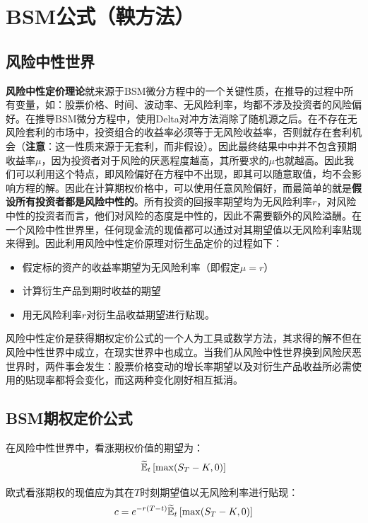 \documentclass[11pt]{article}
\begin{document}
\section{BSM公式（鞅方法）}

\subsection{风险中性世界}

\textbf{风险中性定价理论}就来源于BSM微分方程中的一个关键性质，在推导的过程中所有变量，如：股票价格、时间、波动率、无风险利率，均都不涉及投资者的风险偏好。在推导BSM微分方程中，使用Delta对冲方法消除了随机源之后。在不存在无风险套利的市场中，投资组合的收益率必须等于无风险收益率，否则就存在套利机会（\textbf{注意}：这一性质来源于无套利，而非假设）。因此最终结果中中并不包含预期收益率$\mu$，因为投资者对于风险的厌恶程度越高，其所要求的$\mu$也就越高。因此我们可以利用这个特点，即风险偏好在方程中不出现，即其可以随意取值，均不会影响方程的解。因此在计算期权价格中，可以使用任意风险偏好，而最简单的就是\textbf{假设所有投资者都是风险中性的}。所有投资的回报率期望均为无风险利率$r$，对风险中性的投资者而言，他们对风险的态度是中性的，因此不需要额外的风险溢酬。在一个风险中性世界里，任何现金流的现值都可以通过对其期望值以无风险利率贴现来得到。因此利用风险中性定价原理对衍生品定价的过程如下：
\begin{itemize}
    \item 假定标的资产的收益率期望为无风险利率（即假定$\mu=r$）
    \item 计算衍生产品到期时收益的期望
    \item 用无风险利率$r$对衍生品收益期望进行贴现。
\end{itemize}

风险中性定价是获得期权定价公式的一个人为工具或数学方法，其求得的解不但在风险中性世界中成立，在现实世界中也成立。当我们从风险中性世界换到风险厌恶世界时，两件事会发生：股票价格变动的增长率期望以及对衍生产品收益所必需使用的贴现率都将会变化，而这两种变化刚好相互抵消。

\subsection{BSM期权定价公式}

在风险中性世界中，看涨期权价值的期望为：
\begin{equation*}
    \widetilde{\mathbb{E}}_t \left[ \max(S_T-K,0) \right]
\end{equation*}

欧式看涨期权的现值应为其在$T$时刻期望值以无风险利率进行贴现：
\begin{equation*}
    c = e^{-r(T-t)} \widetilde{\mathbb{E}}_t \left[ \max(S_T-K,0) \right]
\end{equation*}
\end{document}
